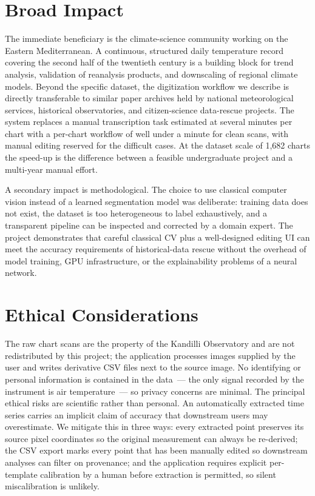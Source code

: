 \documentclass[a4paper,12pt]{report}
\begin{document}
\section{Broad Impact}

The immediate beneficiary is the climate-science community working on the Eastern Mediterranean. A continuous, structured daily temperature record covering the second half of the twentieth century is a building block for trend analysis, validation of reanalysis products, and downscaling of regional climate models. Beyond the specific dataset, the digitization workflow we describe is directly transferable to similar paper archives held by national meteorological services, historical observatories, and citizen-science data-rescue projects. The system replaces a manual transcription task estimated at several minutes per chart with a per-chart workflow of well under a minute for clean scans, with manual editing reserved for the difficult cases. At the dataset scale of 1,682 charts the speed-up is the difference between a feasible undergraduate project and a multi-year manual effort.

A secondary impact is methodological. The choice to use classical computer vision instead of a learned segmentation model was deliberate: training data does not exist, the dataset is too heterogeneous to label exhaustively, and a transparent pipeline can be inspected and corrected by a domain expert. The project demonstrates that careful classical CV plus a well-designed editing UI can meet the accuracy requirements of historical-data rescue without the overhead of model training, GPU infrastructure, or the explainability problems of a neural network.

\section{Ethical Considerations}

The raw chart scans are the property of the Kandilli Observatory and are not redistributed by this project; the application processes images supplied by the user and writes derivative CSV files next to the source image. No identifying or personal information is contained in the data~--- the only signal recorded by the instrument is air temperature~--- so privacy concerns are minimal. The principal ethical risks are scientific rather than personal. An automatically extracted time series carries an implicit claim of accuracy that downstream users may overestimate. We mitigate this in three ways: every extracted point preserves its source pixel coordinates so the original measurement can always be re-derived; the CSV export marks every point that has been manually edited so downstream analyses can filter on provenance; and the application requires explicit per-template calibration by a human before extraction is permitted, so silent miscalibration is unlikely.
\end{document}
